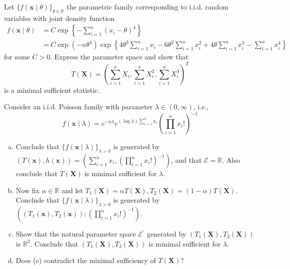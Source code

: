 \begin{exercise}
    Let \(\{f(\mathbf{x} \mid \theta)\}_{\theta \in \mathbb{R}}\) the parametric family corresponding to i.i.d. random variables with joint density function
    \[
        \begin{aligned}
            f(\mathbf{x} \mid \theta)&=C \exp \left\{-\sum_{i=1}^{n}\left(x_{i}-\theta\right)^{4}\right\}\\
            &=C \exp \left(-n \theta^{4}\right) \exp \left\{4 \theta^{3} \sum_{i=1}^{n} x_{i}-6 \theta^{2} \sum_{i=1}^{n} x_{i}^{2}+4 \theta \sum_{i=1}^{n} x_{i}^{3}-\sum_{i=1}^{n} x_{i}^{4}\right\}
        \end{aligned}
    \]
    for some \(C>0\). Express the parameter space and show that
    \[
        T(\mathbf{X})=\left(\sum_{i=1}^{n} X_{i}, \sum_{i=1}^{n} X_{i}^{2}, \sum_{i=1}^{n} X_{i}^{3}\right)^T
    \]
    is a minimal sufficient statistic. 
\end{exercise}

\begin{exercise}
    Consider an i.i.d. Poisson family with parameter \(\lambda \in(0, \infty)\), i.e.,
    \[
        f(\mathbf{x} \mid \lambda)=e^{-n \lambda} e^{(\log \lambda) \sum_{i=1}^{n} x_{i}}\left(\prod_{i=1}^{n} x_{i} !\right)^{-1}
    \]
    \begin{enumerate}[(a)]
        \item Conclude that \(\{f(\mathbf{x} \mid \lambda)\}_{\lambda>0}\) is generated by \((T(\mathbf{x}), h(\mathbf{x}))=\left(\sum_{i=1}^{n} x_{i},\left(\prod_{i=1}^{n} x_{i} !\right)^{-1}\right)\), and that \(\mathcal{E}=\mathbb{R}\). Also conclude that \(T(\mathbf{X})\) is minimal sufficient for \(\lambda\). 
        \item Now fix \(\alpha \in \mathbb{R}\) and let \(T_{1}(\mathbf{X})=\alpha T(\mathbf{X}), T_{2}(\mathbf{X})=(1-\alpha) T(\mathbf{X})\). Conclude that \(\{f(\mathbf{x} \mid \lambda)\}_{\lambda>0}\) is generated by \(\left(\left(T_{1}(\mathbf{x}), T_{2}(\mathbf{x})\right) ;\left(\prod_{i=1}^{n} x_{i} !\right)^{-1}\right)\). 
        \item Show that the natural parameter space \(\mathcal{E}^{\prime}\) generated by \(\left(T_{1}(\mathbf{X}), T_{2}(\mathbf{X})\right)\) is \(\mathbb{R}^{2}\). Conclude that \(\left(T_{1}(\mathbf{X}), T_{2}(\mathbf{X})\right)\) is minimal sufficient for \(\lambda\). 
        \item Does (c) contradict the minimal sufficiency of \(T(\mathbf{X})\)? 
    \end{enumerate}
\end{exercise}


